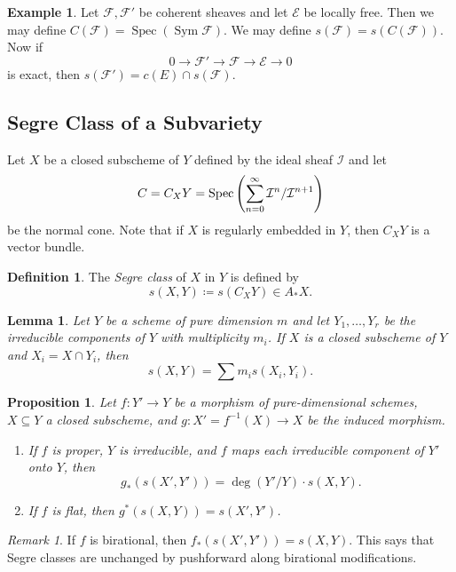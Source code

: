 \documentclass[leqno, openany]{memoir}
\newtheorem{prop}[thm]{Proposition}
\newtheorem{lem}[thm]{Lemma}
\theoremstyle{definition}
\newtheorem{defn}[thm]{Definition}
\newtheorem{exm}[thm]{Example}
\theoremstyle{remark}
\newtheorem{rmk}[thm]{Remark}
\theoremstyle{plain}
\theoremstyle{definition}
\theoremstyle{remark}
\newcommand{\mc}[1]{\mathcal{#1}}
\DeclareMathOperator{\Spec}{Spec}
\begin{document}
\begin{exm}
    Let $\mc{F}, \mc{F'}$ be coherent sheaves and let $\mc{E}$ be locally free. Then we may define $C(\mc{F}) = \Spec ( \operatorname{Sym} \mc{F} )$. We may define $s(\mc{F}) = s(C(\mc{F}))$. Now if 
    \[ 0 \to \mc{F}' \to \mc{F} \to \mc{E} \to 0 \]
    is exact, then $s(\mc{F'}) = c(E) \cap s(\mc{F})$.
\end{exm}

\subsection{Segre Class of a Subvariety}%
\label{sub:segre_class_of_a_subvariety}

Let $X$ be a closed subscheme of $Y$ defined by the ideal sheaf $\mc{I}$ and let
\[ C = C_X Y = \Spec \qty( \sum_{n=0}^{\infty} \mc{I}^n / \mc{I}^{n+1} ) \]
be the normal cone. Note that if $X$ is regularly embedded in $Y$, then $C_X Y$ is a vector bundle.

\begin{defn}
    The \textit{Segre class} of $X$ in $Y$ is defined by
    \[ s(X,Y) \coloneqq s(C_X Y) \in A_* X. \]
\end{defn}

\begin{lem}
    Let $Y$ be a scheme of pure dimension $m$ and let $Y_1, \ldots, Y_r$ be the irreducible components of $Y$ with multiplicity $m_i$. If $X$ is a closed subscheme of $Y$ and $X_i = X \cap Y_i$, then
    \[ s(X,Y) = \sum m_i s(X_i, Y_i). \]
\end{lem}

\begin{prop}
    Let $f \colon Y' \to Y$ be a morphism of pure-dimensional schemes, $X \subseteq Y$ a closed subscheme, and $g \colon X' = f^{-1}(X) \to X$ be the induced morphism.
    \begin{enumerate}
        \item If $f$ is proper, $Y$ is irreducible, and $f$ maps each irreducible component of $Y'$ onto $Y$, then
            \[ g_* (s(X', Y')) = \deg (Y'/Y) \cdot s(X,Y). \]
        \item If $f$ is flat, then $g^*(s(X,Y)) = s(X',Y')$.
    \end{enumerate}
\end{prop}

\begin{rmk}
    If $f$ is birational, then $f_* (s(X', Y')) = s(X,Y)$. This says that Segre classes are unchanged by pushforward along birational modifications.
\end{rmk}
\end{document}
